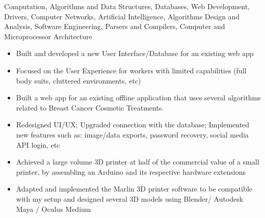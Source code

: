 \documentclass[10pt,a4paper]{altacv}
\begin{document}

\begin{fullwidth}
\makecvheader
\end{fullwidth}

\begin{itemize}
    \itemGraphical Computation, Algorithms and Data Structures, Databases, Web Development, Drivers, Computer Networks, Artificial Intelligence, Algorithms Design and Analysis, Software Engineering, Parsers and Compilers, Computer and Microprocessor Architecture
\end{itemize}


\begin{itemize}
\item Built and developed a new User Interface/Database for an existing web app
\item Focused on the User Experience for workers with limited capabilities (full body suits, cluttered environments, etc)
\end{itemize}

\vspace{2mm}

\begin{itemize}
\item Built a web app for an existing offline application that uses several algorithms related to Breast Cancer Cosmetic Treatments.
\item Redesigned UI/UX; Upgraded connection with the database; Implemented new features such as: image/data exports, password recovery, social media API login, etc

\end{itemize}


\begin{itemize}
    \item Achieved a large volume 3D printer at half of the commercial value of a small printer, by assembling an Arduino and its respective hardware extensions
    \item Adapted and implemented the Marlin 3D printer software to be compatible with my setup and designed several 3D models using Blender/ Autodesk Maya / Oculus Medium
\end{itemize}
\end{document}
